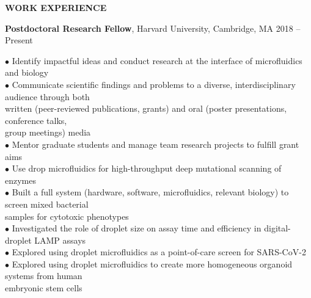 \documentclass[10pt]{article}
\newenvironment{changemargin}[2]{%
  \list{}{\rightmargin#2\leftmargin#1
    \parsep=0pt\topsep=1pt\partopsep=0pt}
\item[]} {\endlist}
\newenvironment{indentmore}{\begin{changemargin}{10pt}{0cm}}{\end{changemargin}}
\begin{document}
\textbf{\large WORK EXPERIENCE}
\begin{indentmore}
{\bf Postdoctoral Research Fellow}, Harvard University, Cambridge, MA \hfill 2018 -- Present
\begin{indentmore}
$\bullet$ Identify impactful ideas and conduct research at the interface of microfluidics and biology\\
$\bullet$ Communicate scientific findings and problems to a diverse, interdisciplinary audience through both\\ \hspace*{5pt} written (peer-reviewed publications, grants) and oral (poster presentations, conference talks,\\ \hspace*{5pt} group meetings) media\\
$\bullet$ Mentor graduate students and manage team research projects to fulfill grant aims\\
$\bullet$ Use drop microfluidics for high-throughput deep mutational scanning of enzymes\\
$\bullet$ Built a full system (hardware, software, microfluidics, relevant biology) to screen mixed bacterial\\ \hspace*{5pt} samples for cytotoxic phenotypes\\
$\bullet$ Investigated the role of droplet size on assay time and efficiency in digital-droplet LAMP assays\\
$\bullet$ Explored using droplet microfluidics as a point-of-care screen for SARS-CoV-2\\
$\bullet$ Explored using droplet microfluidics to create more homogeneous organoid systems from human\\ \hspace*{5pt} embryonic stem cells\\
\end{indentmore}


\end{indentmore}
\end{document}
